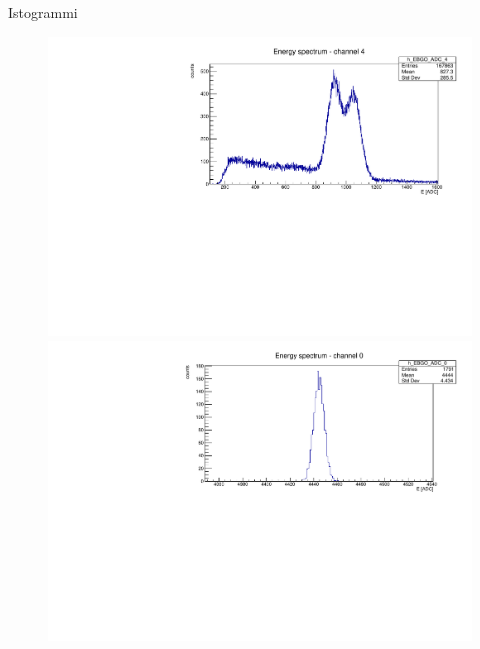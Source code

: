\documentclass [xcolor=svgnames] {beamer}
\begin{document}
\begin{frame}{Istogrammi}
\begin{figure}
		\begin{minipage}{0.45\textwidth}
			\centering
			\includegraphics[width=\linewidth]{img/ex1777.pdf} %
		\end{minipage}
		\hfill
		\begin{minipage}{0.45\textwidth}
			\centering
			\includegraphics[width=\linewidth]{img/pulser.pdf} %
		\end{minipage}
	\end{figure}
\end{frame}
\end{document}
